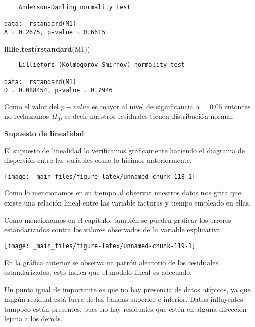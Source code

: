 \documentclass[
  a4paper,
  oneside,
  openany]{book}
\newenvironment{Shaded}{\begin{snugshade}}{\end{snugshade}}
\newcommand{\KeywordTok}[1]{\textcolor[rgb]{0.13,0.29,0.53}{\textbf{#1}}}
\newcommand{\NormalTok}[1]{#1}
\begin{document}
\begin{verbatim}
    Anderson-Darling normality test

data:  rstandard(M1)
A = 0.2675, p-value = 0.6615
\end{verbatim}

\begin{Shaded}
\begin{Highlighting}[]
\KeywordTok{lillie.test}\NormalTok{(}\KeywordTok{rstandard}\NormalTok{(M1))}
\end{Highlighting}
\end{Shaded}

\begin{verbatim}
    Lilliefors (Kolmogorov-Smirnov) normality test

data:  rstandard(M1)
D = 0.088454, p-value = 0.7946
\end{verbatim}

Como el valor del \(p-value\) es mayor al nivel de significancia \(\alpha=0.05\) entonces no rechazamos \(H_{0}\), es decir nuestros residuales tienen distribución normal.

\textbf{Supuesto de linealidad}

El supuesto de linealidad lo verificamos gráficamente haciendo el diagrama de dispersión entre las variables como lo hicimos anteriormente.

\begin{center}\texttt{[image: \_main\_files/figure-latex/unnamed-chunk-118-1]} \end{center}

Como lo mencionamos en su tiempo al observar nuestros datos nos grita que existe una relación lineal entre las variable facturas y tiempo empleado en ellas.

Como mencionamos en el capítulo, también se pueden graficar los errores estandarizados contra los valores observados de la variable explicativa.

\begin{center}\texttt{[image: \_main\_files/figure-latex/unnamed-chunk-119-1]} \end{center}

En la gráfica anterior se observa un patrón aleatorio de los residuales estandarizados, esto indica que el modelo lineal es adecuado.

Un punto igual de importante es que no hay presencia de datos atípicos, ya que ningún residual está fuera de las bandas superior e inferior. Datos influyentes tampoco están presentes, pues no hay residuales que estén en alguna dirección lejana a los demás.
\end{document}
